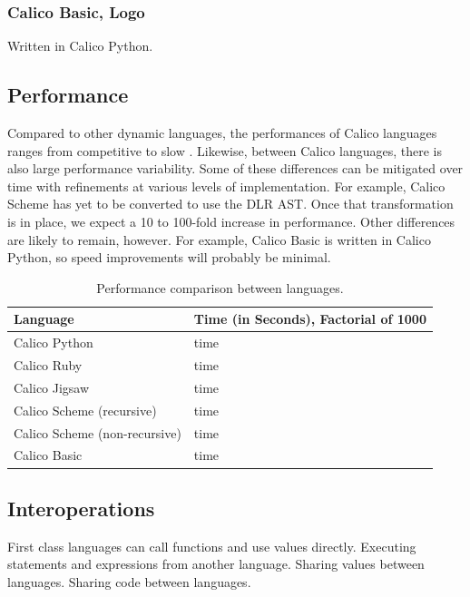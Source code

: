 \documentclass[preprint]{sigplanconf}
\begin{document}
\subsubsection{Calico Basic, Logo}

Written in Calico Python. 

\subsection{Performance}

Compared to other dynamic languages, the performances of Calico
languages ranges from competitive to slow
\cite{python-benchmark}. Likewise, between Calico languages, there is
also large performance variability. Some of these differences can be
mitigated over time with refinements at various levels of
implementation. For example, Calico Scheme has yet to be converted to
use the DLR AST. Once that transformation is in place, we expect a 10
to 100-fold increase in performance. Other differences are likely to
remain, however. For example, Calico Basic is written in Calico
Python, so speed improvements will probably be minimal.

\begin{table}[h]\footnotesize
  \centering
  \begin{tabular}{ l | l }
    \hline                        
    \textbf{Language} & \textbf{Time (in Seconds), Factorial of 1000} \\
    \hline                        
    Calico Python                 & time \\
    Calico Ruby                   & time \\
    Calico Jigsaw                 & time \\
    Calico Scheme (recursive)     & time \\
    Calico Scheme (non-recursive) & time \\
    Calico Basic                  & time \\
  \end{tabular}
  \caption{Performance comparison between languages.}
  \label{performance}
\end{table}

\subsection{Interoperations}

First class languages can call functions and use values
directly. Executing statements and expressions from another language.
Sharing values between languages.  Sharing code between languages.
\end{document}
